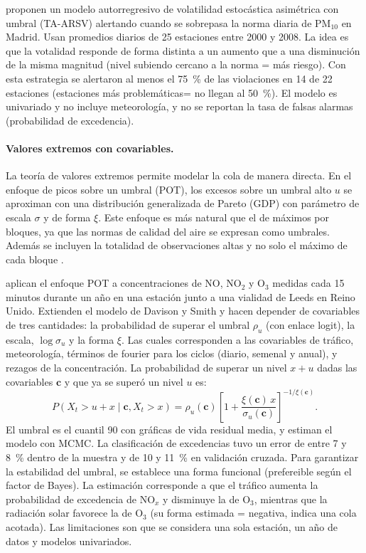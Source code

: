 \documentclass[11pt]{article}
\begin{document}
\citet{montero2011} proponen un modelo autorregresivo de volatilidad estocástica asimétrica con umbral (TA-ARSV) alertando cuando se sobrepasa la norma diaria de PM$_{10}$ en Madrid. Usan promedios diarios de 25 estaciones entre 2000 y 2008. La idea es que la votalidad responde de forma distinta a un aumento que a una disminución de la misma magnitud (nivel subiendo cercano a la norma = más riesgo). Con esta estrategia se alertaron al menos el 75~\% de las violaciones en 14 de 22 estaciones (estaciones más problemáticas= no llegan al 50~\%). El modelo es univariado y no incluye meteorología, y no se reportan la tasa de falsas alarmas (probabilidad de excedencia). 

\paragraph{Valores extremos con covariables.}
La teoría de valores extremos permite modelar la cola de manera directa. En el enfoque de picos sobre un umbral (POT), los excesos sobre un umbral alto $u$ se aproximan con una distribución generalizada de Pareto (GDP) con parámetro de escala $\sigma$ y de forma $\xi$\citep{Coles2001}. Este enfoque es más natural que el de máximos por bloques, ya que las normas de calidad del aire se expresan como umbrales. Además se incluyen la totalidad de observaciones altas y no solo el máximo de cada bloque \citep{gyarmati2017,tang2026}.

\citet{gyarmati2017} aplican el enfoque POT a concentraciones de NO, NO$_2$ y O$_3$ medidas cada 15 minutos durante un año en una estación junto a una vialidad de Leeds en Reino Unido. Extienden el modelo de Davison y Smith y hacen depender de covariables de tres cantidades: la probabilidad de superar el umbral $\rho_u$ (con enlace logit), la escala, $\log\sigma_u$ y la forma $\xi$. Las cuales corresponden a las covariables de tráfico, meteorología, términos de fourier para los ciclos (diario, semenal y anual), y rezagos de la concentración. La probabilidad de superar un nivel $x+u$ dadas las covariables $\mathbf{c}$ y que ya se superó un nivel $u$ es:
\begin{equation}
    P(X_t > u + x \mid \mathbf{c}, X_t > x) = \rho_u(\mathbf{c}) \left[ 1 + \frac{\xi(\mathbf{c})\, x}{\sigma_u(\mathbf{c})} \right]^{-1/\xi(\mathbf{c})}.
\end{equation}
El umbral es el cuantil 90 con gráficas de vida residual media, y estiman el modelo con MCMC. La clasificación de excedencias tuvo un error de entre 7 y 8~\% dentro de la muestra y de 10 y 11~\% en validación cruzada. Para garantizar la estabilidad del umbral, se establece una forma funcional (prefereible según el factor de Bayes). La estimación corresponde a que el tráfico aumenta la probabilidad de excedencia de NO$_x$ y disminuye la de O$_3$, mientras que la radiación solar favorece la de O$_3$ (su forma estimada = negativa, indica una cola acotada). Las limitaciones son que se considera una sola estación, un año de datos y modelos univariados. 
\end{document}

